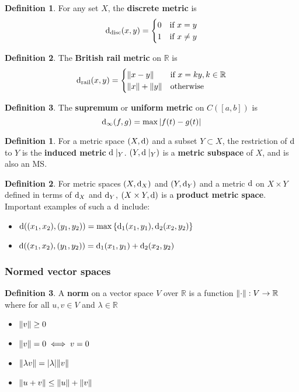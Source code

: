 \documentclass[12pt]{article}
\theoremstyle{definition}
\newtheorem{defn}{Definition}[section]
\newtheorem*{defn*}{Definition}
\DeclarePairedDelimiter\length{\lVert}{\rVert}
\renewcommand{\d}{{\textnormal{d}}}
\begin{document}
\begin{defn*}
	For any set $X$, the \textbf{discrete metric} is 
	$$\d_{\text{disc}}(x, y) = \begin{cases}0 & \text{if } x = y\\1 & \text{if } x \neq y\end{cases}$$
\end{defn*}

\begin{defn*}
	The \textbf{British rail metric} on $\mathbb{R}$ is 
	$$\d_{\text{rail}}(x, y) = \begin{cases}\length{x - y} & \text{if } x = ky, k \in \mathbb{R}\\\length{x} + \length{y} & \text{otherwise}\end{cases}$$
\end{defn*}

\begin{defn*}
	The \textbf{supremum} or \textbf{uniform metric} on $C([a, b])$ is
	$$\d_{\infty}(f, g) = \max{\lvert f(t) - g(t) \rvert}$$
\end{defn*}

\begin{defn}
	For a metric space $(X, \d)$ and a subset $Y \subset X$, the restriction of $\d$ to $Y$ is the \textbf{induced metric} $\d\mid_Y$.
	$(Y, \d\mid_Y)$ is a \textbf{metric subspace} of $X$, and is also an MS.
\end{defn}

\begin{defn}
	For metric spaces $(X, \d_X)$ and $(Y, \d_Y)$ and a metric $\d$ on $X \times Y$ defined in terms of $\d_X$ and $\d_Y$, $(X \times Y, \d)$ is a \textbf{product metric space}.
	Important examples of such a $\d$ include:
	\begin{itemize}
		\item $\d((x_1, x_2), (y_1, y_2)) = \max{\{\d_1(x_1, y_1), \d_2(x_2, y_2)\}}$
		\item $\d((x_1, x_2), (y_1, y_2)) = \d_1(x_1, y_1) + \d_2(x_2, y_2)$
	\end{itemize}
\end{defn}

\subsubsection{Normed vector spaces}

\begin{defn}
	A \textbf{norm} on a vector space $V$ over $\mathbb{R}$ is a function $\length{\cdot} : V \to \mathbb{R}$ where for all $u, v \in V$ and $\lambda \in \mathbb{R}$
	\begin{itemize}
		\item $\length{v} \geq 0$
		\item $\length{v} = 0 \iff v = 0$
		\item $\length{\lambda v} = \lvert\lambda\rvert\length{v}$
		\item $\length{u + v} \leq \length{u} + \length{v}$
	\end{itemize}
\end{defn}
\end{document}
